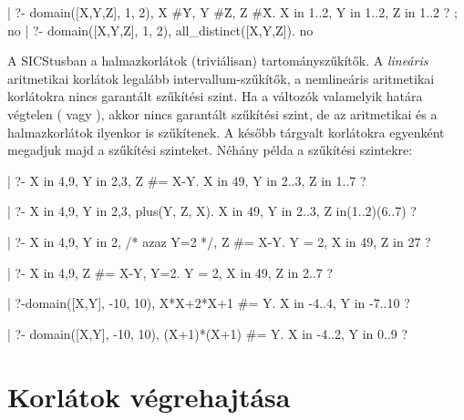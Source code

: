 \begin{prologcode}
| ?- domain([X,Y,Z], 1, 2), X #\= Y, Y #\= Z, Z #\= X.
X in 1..2, Y in 1..2, Z in 1..2 ? ;
no
| ?- domain([X,Y,Z], 1, 2), all_distinct([X,Y,Z]).
no
\end{prologcode}

A SICStusban a halmazkorlátok (triviálisan) tartományszűkítők. A
\emph{lineáris} aritmetikai korlátok legalább intervallum-szűkítők,
a nemlineáris aritmetikai korlátokra nincs garantált szűkítési szint.
Ha a változók valamelyik határa végtelen ( vagy ), akkor
nincs garantált szűkítési szint, de az aritmetikai és a halmazkorlátok
ilyenkor is szűkítenek. A később tárgyalt korlátokra egyenként megadjuk majd
a szűkítési szinteket.
\br
Néhány példa a szűkítési szintekre:
\begin{prologcode}
| ?- X in {4,9}, Y in {2,3}, Z #= X-Y. %
X in {4}\/{9}, Y in 2..3, Z in 1..7 ?
\end{prologcode}
\begin{prologcode}
| ?- X in {4,9}, Y in {2,3}, plus(Y, Z, X).
X in {4}\/{9}, Y in 2..3, Z in(1..2)\/(6..7) ?
\end{prologcode}
\begin{prologcode}
| ?- X in {4,9}, Y in {2}, /* azaz Y=2 */, Z #= X-Y. %
Y = 2, X in {4}\/{9}, Z in {2}\/{7} ?
\end{prologcode}
\begin{prologcode}
| ?- X in {4,9}, Z #= X-Y, Y=2.
Y = 2, X in {4}\/{9}, Z in 2..7 ?
\end{prologcode}
\begin{prologcode}
| ?-domain([X,Y], -10, 10), X*X+2*X+1 #= Y.
X in -4..4, Y in -7..10 ?
\end{prologcode}
\begin{prologcode}
| ?- domain([X,Y], -10, 10), (X+1)*(X+1) #= Y.
X in -4..2, Y in 0..9 ?
\end{prologcode}



\section{Korlátok végrehajtása}

\label{korlatvegrehajtas}

